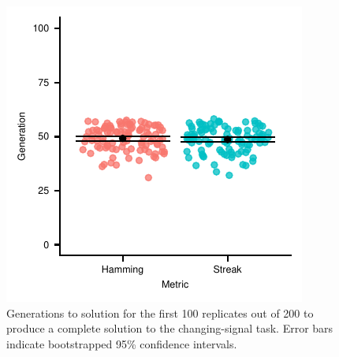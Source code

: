 \begin{figure}[!htbp]
\centering
\includegraphics[width=\linewidth]{img/gp_results/panel-cst-times.pdf}%
\caption{
Generations to solution for the first 100 replicates out of 200 to produce a complete solution to the changing-signal task.
Error bars indicate bootstrapped 95\% confidence intervals.
 }
\label{fig:cst-times}
\end{figure}
